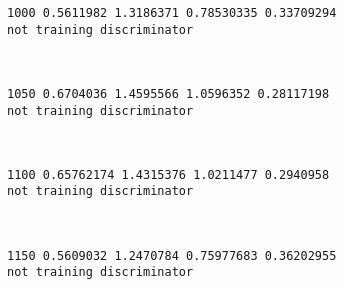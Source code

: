 \documentclass[11pt]{article}
\begin{document}
    \begin{Verbatim}[commandchars=\\\{\}]
1000 0.5611982 1.3186371 0.78530335 0.33709294
not training discriminator

    \end{Verbatim}

    \begin{center}
    \end{center}
    { \hspace*{\fill} \\}
    
    \begin{Verbatim}[commandchars=\\\{\}]
1050 0.6704036 1.4595566 1.0596352 0.28117198
not training discriminator

    \end{Verbatim}

    \begin{center}
    \end{center}
    { \hspace*{\fill} \\}
    
    \begin{Verbatim}[commandchars=\\\{\}]
1100 0.65762174 1.4315376 1.0211477 0.2940958
not training discriminator

    \end{Verbatim}

    \begin{center}
    \end{center}
    { \hspace*{\fill} \\}
    
    \begin{Verbatim}[commandchars=\\\{\}]
1150 0.5609032 1.2470784 0.75977683 0.36202955
not training discriminator

    \end{Verbatim}

    \begin{center}
    \end{center}
    { \hspace*{\fill} \\}
    
\end{document}
